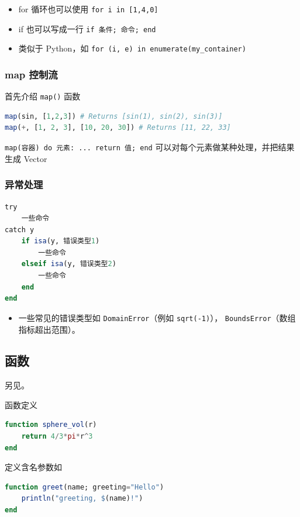 \begin{itemize}
\item for 循环也可以使用 \verb`for i in [1,4,0]`
\item if 也可以写成一行 \verb`if 条件; 命令; end`
\item 类似于 Python，如 \verb`for (i, e) in enumerate(my_container)`
\end{itemize}

\subsubsection{map 控制流}
首先介绍 \verb`map()` 函数
\begin{lstlisting}[language=julia]
map(sin, [1,2,3]) # Returns [sin(1), sin(2), sin(3)]
map(+, [1, 2, 3], [10, 20, 30]) # Returns [11, 22, 33]
\end{lstlisting}

\verb`map(容器) do 元素: ... return 值; end` 可以对每个元素做某种处理，并把结果生成 Vector


\subsubsection{异常处理}
\begin{lstlisting}[language=julia]
try 
    一些命令
catch y
    if isa(y, 错误类型1)
        一些命令
    elseif isa(y, 错误类型2)
        一些命令
    end
end
\end{lstlisting}
\begin{itemize}
\item 一些常见的错误类型如 \verb`DomainError`（例如 \verb`sqrt(-1)`）， \verb`BoundsError`（数组指标超出范围）。
\end{itemize}

\subsection{函数}

另见。

函数定义
\begin{lstlisting}[language=julia]
function sphere_vol(r)
    return 4/3*pi*r^3
end
\end{lstlisting}

定义含名参数如
\begin{lstlisting}[language=julia]
function greet(name; greeting="Hello")
    println("greeting, $(name)!")
end
\end{lstlisting}

